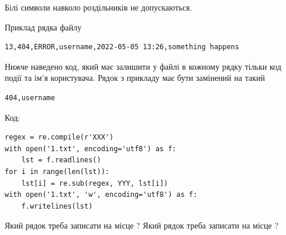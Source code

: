 \documentclass[12pt, ukrainian]{article}
\begin{document}
{Білі символи навколо роздільників не допускаються.

Приклад рядка файлу



\begin{verbatim}
13,404,ERROR,username,2022-05-05 13:26,something happens
\end{verbatim}


Нижче наведено код, який має залишити у файлі в кожному рядку тільки код події та ім'я користувача. Рядок з прикладу має бути замінений на такий



\begin{verbatim}
404,username
\end{verbatim}




Код:



\begin{verbatim}
regex = re.compile(r'XXX')
with open('1.txt', encoding='utf8') as f:
    lst = f.readlines()
for i in range(len(lst)):
    lst[i] = re.sub(regex, YYY, lst[i])
with open('1.txt', 'w', encoding='utf8') as f:
    f.writelines(lst)
\end{verbatim}





Який рядок треба записати на місце  ?
Який рядок треба записати на місце  ?\par

}
\newpage
\end{document}
